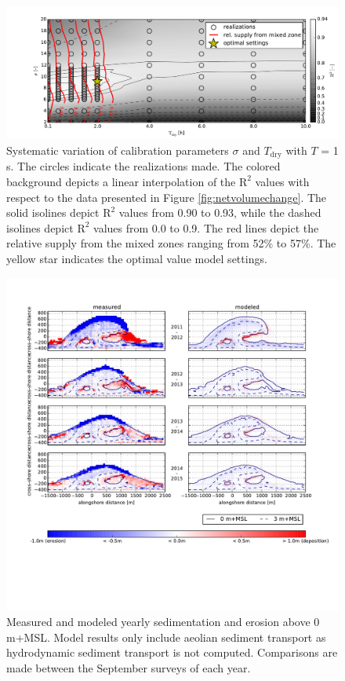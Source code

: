 \begin{figure}
  \centering
  \includegraphics[width=\columnwidth]{../Figures/calibration}
  \caption{Systematic variation of calibration parameters $\sigma$ and
    $T_{\mathrm{dry}}$ with $T$ = 1 s. The circles indicate the
    realizations made. The colored background depicts a linear
    interpolation of the $\mathrm{R^2}$ values with respect to the
    data presented in Figure \ref{fig:netvolumechange}. The solid
    isolines depict $\mathrm{R}^2$ values from 0.90 to 0.93, while the
    dashed isolines depict $\mathrm{R}^2$ values from 0.0 to 0.9. The
    red lines depict the relative supply from the mixed zones ranging
    from 52\% to 57\%. The yellow star indicates the optimal value
    model settings.}
  \label{fig:calibration}
\end{figure}


\begin{figure}
  \centering
  \includegraphics[width=\columnwidth]{../Figures/model_sedero}
  \caption{Measured and modeled yearly sedimentation and erosion
    above 0 m+MSL. Model results only include aeolian sediment
    transport as hydrodynamic sediment transport is not
    computed. Comparisons are made between the September surveys of
    each year.}
  \label{fig:sedero_model}
\end{figure}


